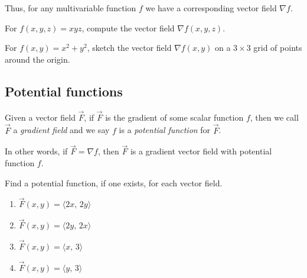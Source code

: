 \noindent Thus, for any multivariable function $f$ we have a corresponding vector field $\nabla f$.

\pagebreak 

\begin{ex}
    For $f(x,y,z)=xyz$, compute the vector field $\nabla f(x,y,z)$.
\end{ex}\vspace{1in}

\begin{ex}
    For $f(x,y)=x^2+y^2$, sketch the vector field $\nabla f(x,y)$ on a $3\times3$ grid of points around the origin.
\end{ex}

\vspace{1.6in}

\subsection{Potential functions}
\begin{defn}
    Given a vector field $\vec{F}$, if $\vec{F}$ is the gradient of some scalar function $f$, then we call $\vec{F}$ a \emph{gradient field} and we say $f$ is a \emph{potential function} for $\vec{F}$.
    
    In other words, if $\vec{F}=\nabla f$, then $\vec{F}$ is a gradient vector field with potential function $f$.
\end{defn}

\bigskip

\vspace{.6in}

\begin{ex}\label{ex:first-search-for-potential-fns}
    Find a potential function, if one exists, for each vector field.
    \begin{multicols}{4}
    \begin{enumerate}
        \item \mbox{$\vec{F}(x,y)=\langle 2x,\,2y\rangle$}
        \item \mbox{$\vec{F}(x,y)=\langle 2y,\,2x\rangle$}
        \item \mbox{$\vec{F}(x,y)=\langle x,\,3\rangle$}
        \item \mbox{$\vec{F}(x,y)=\langle y,\,3\rangle$}
    \end{enumerate}
    \end{multicols}
\end{ex}

\vfill


